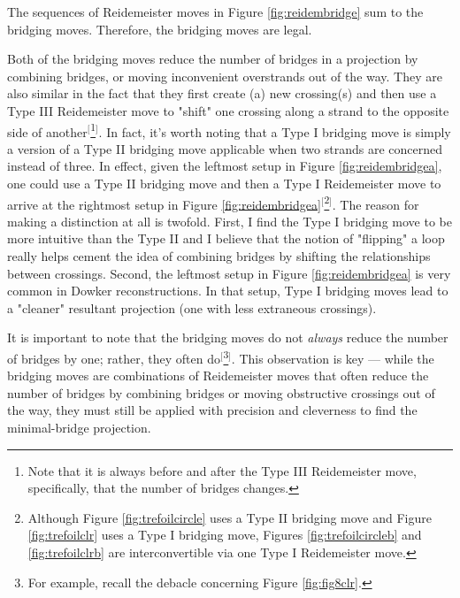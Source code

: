 \documentclass[titlepage,11pt]{article}
\begin{document}
The sequences of Reidemeister moves in Figure \ref{fig:reidembridge} sum to the bridging moves. Therefore, the bridging moves are legal.\par
Both of the bridging moves reduce the number of bridges in a projection by combining bridges, or moving inconvenient overstrands out of the way. They are also similar in the fact that they first create (a) new crossing(s) and then use a Type III Reidemeister move to "shift" one crossing along a strand to the opposite side of another$^[$\footnote{Note that it is always before and after the Type III Reidemeister move, specifically, that the number of bridges changes.}$^]$. In fact, it's worth noting that a Type I bridging move is simply a version of a Type II bridging move applicable when two strands are concerned instead of three. In effect, given the leftmost setup in Figure \ref{fig:reidembridgea}, one could use a Type II bridging move and then a Type I Reidemeister move to arrive at the rightmost setup in Figure \ref{fig:reidembridgea}$^[$\footnote{Although Figure \ref{fig:trefoilcircle} uses a Type II bridging move and Figure \ref{fig:trefoilclr} uses a Type I bridging move, Figures \ref{fig:trefoilcircleb} and \ref{fig:trefoilclrb} are interconvertible via one Type I Reidemeister move.}$^]$. The reason for making a distinction at all is twofold. First, I find the Type I bridging move to be more intuitive than the Type II and I believe that the notion of "flipping" a loop really helps cement the idea of combining bridges by shifting the relationships between crossings. Second, the leftmost setup in Figure \ref{fig:reidembridgea} is very common in Dowker reconstructions. In that setup, Type I bridging moves lead to a "cleaner" resultant projection (one with less extraneous crossings).\par
It is important to note that the bridging moves do not \emph{always} reduce the number of bridges by one; rather, they often do$^[$\footnote{For example, recall the debacle concerning Figure \ref{fig:fig8clr}.}$^]$. This observation is key --- while the bridging moves are combinations of Reidemeister moves that often reduce the number of bridges by combining bridges or moving obstructive crossings out of the way, they must still be applied with precision and cleverness to find the minimal-bridge projection.\par
\end{document}
